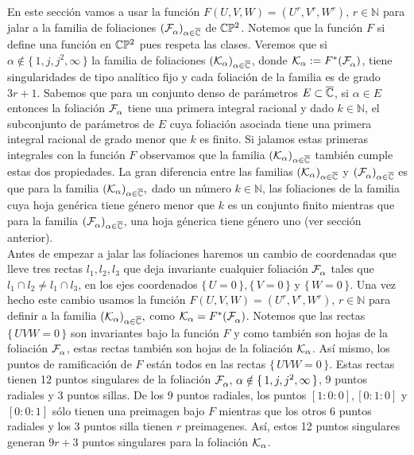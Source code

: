 En este sección vamos a usar la función $F(U,V,W)=(U^{r},V^{r},W^{r}),\, r\in\mathbb{N}$ para jalar a la familia de foliaciones $(\mathcal{F}^{\ }_{\alpha})_{\alpha\in\overline{\mathbb{C}}}$ de $\mathbb{C}\mathbb{P}^2$. Notemos que la función $F$ si define una función en $\mathbb{C}\mathbb{P}^2$ pues respeta las clases. Veremos que si $\alpha\notin\{\, 1,j,j^{2},\infty\, \}$ la familia de foliaciones $(\mathcal{K}_{\alpha})_{\alpha\in\overline{\mathbb{C}}}$, donde $\mathcal{K}_{\alpha}:=F^{*}(\mathcal{F}^{\ }_{\alpha})$, tiene singularidades de tipo analítico fijo y cada foliación de la familia es de grado $3r+1$. Sabemos que para un conjunto denso de parámetros $E\subset\overline{\mathbb{C}}$, si $\alpha\in E$ entonces la foliación $\mathcal{F}^{\ }_{\alpha}$ tiene una primera integral racional y dado $k\in\mathbb{N}$, el subconjunto de parámetros de $E$ cuya foliación asociada tiene una primera integral racional de grado menor que $k$ es finito. Si jalamos estas primeras integrales con la función $F$ observamos que la familia $(\mathcal{K}_{\alpha})_{\alpha\in\overline{\mathbb{C}}}$ también cumple estas dos propiedades. La gran diferencia entre las familias $(\mathcal{K}_{\alpha})_{\alpha\in\overline{\mathbb{C}}}$ y $(\mathcal{F}^{\ }_{\alpha})_{\alpha\in\overline{\mathbb{C}}}$ es que para la familia $(\mathcal{K}_{\alpha})_{\alpha\in\overline{\mathbb{C}}},$ dado un número $k\in\mathbb{N}$, las foliaciones de la familia cuya hoja genérica tiene género menor que $k$ es un conjunto finito mientras que para la familia $(\mathcal{F}^{\ }_{\alpha})_{\alpha\in\overline{\mathbb{C}}}$, una hoja génerica tiene género uno (ver sección anterior).\\

Antes de empezar a jalar las foliaciones haremos un cambio de coordenadas que lleve tres rectas $\mathit{l}_{1},\mathit{l}_{2},\mathit{l}_{3}$ que deja invariante cualquier foliación $\mathcal{F}^{\ }_{\alpha}$ tales que $\mathit{l}_{1}\cap\mathit{l}_{2}\neq\mathit{l}_{1}\cap\mathit{l}_{3}$, en los ejes coordenados $\{\,  U=0\, \},\{\, V=0 \, \}$ y $\{\, W=0 \, \}$. Una vez hecho este cambio usamos la función $F(U,V,W)=(U^{r},V^{r},W^{r}),\, r\in\mathbb{N}$ para definir a la familia $(\mathcal{K}_{\alpha})_{\alpha\in\overline{\mathbb{C}}},$ como $\mathcal{K}_{\alpha}=F^{*}(\mathcal{F}^{\ }_{\alpha})$. Notemos que las rectas $\{\,  UVW=0\,\}$ son invariantes bajo la función $F$ y como también son hojas de la foliación $\mathcal{F}^{\ }_{\alpha}$, estas rectas también son hojas de la foliación $\mathcal{K}_{\alpha}$. Así mismo, los puntos de ramificación de $F$ están todos en las rectas $\{\,  UVW=0\,\}$. Estas rectas tienen 12 puntos singulares de la foliación $\mathcal{F}^{\ }_{\alpha},\, \alpha\notin\{\, 1,j,j^{2},\infty\, \}$, 9 puntos radiales y 3 puntos sillas. De los 9 puntos radiales, los puntos $[1:0:0],[0:1:0]$ y $[0:0:1]$ sólo tienen una preimagen bajo $F$ mientras que los otros 6 puntos radiales y los 3 puntos silla tienen $r$ preimagenes. Así, estos 12 puntos singulares generan $9r+3$ puntos singulares para la foliación $\mathcal{K}_{\alpha}$.

